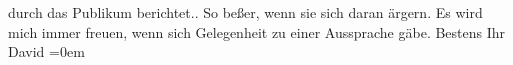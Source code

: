 \begin{ledgroupsized}[t]{13cm}
{{{                  durch das Publikum berichtet.}}}\label{K_L00902_1h}. So beßer, wenn sie sich daran ärgern.\pend
           \pstart
           Es wird mich immer freuen, wenn sich Gelegenheit zu einer Aussprache gäbe.\pend
           \pstart
           Bestens Ihr{\\[\baselineskip]}\spacefill\mbox{David}\pend
           \leftskip=0em{}\endnumbering{}\end{ledgroupsized}  \newcommand{\dateiname}{L00902}\newcommand{\titel}{Jakob Julius David an Arthur Schnitzler, [8. 3. 1899?]}\newcommand{\editorInnen}{Martin Anton Müller und Gerd-Hermann Susen}
      